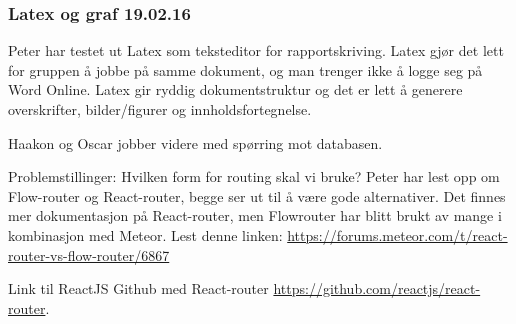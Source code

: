 \documentclass[12pt, oneside]{article}
\begin{document}
\subsubsection{Latex og graf 19.02.16}
Peter har testet ut Latex som teksteditor for rapportskriving. Latex gjør det lett for gruppen å jobbe på samme dokument, og man trenger ikke å logge seg på Word Online. Latex gir ryddig dokumentstruktur og det er lett å generere overskrifter, bilder/figurer og innholdsfortegnelse. 

Haakon og Oscar jobber videre med spørring mot databasen. 

Problemstillinger: Hvilken form for routing skal vi bruke? Peter har lest opp om Flow-router og React-router, begge ser ut til å være gode alternativer. Det finnes mer dokumentasjon på React-router, men Flowrouter har blitt brukt av mange i kombinasjon med Meteor. Lest denne linken: \url{https://forums.meteor.com/t/react-router-vs-flow-router/6867}

Link til ReactJS Github med React-router \url{https://github.com/reactjs/react-router}.


\end{document}
